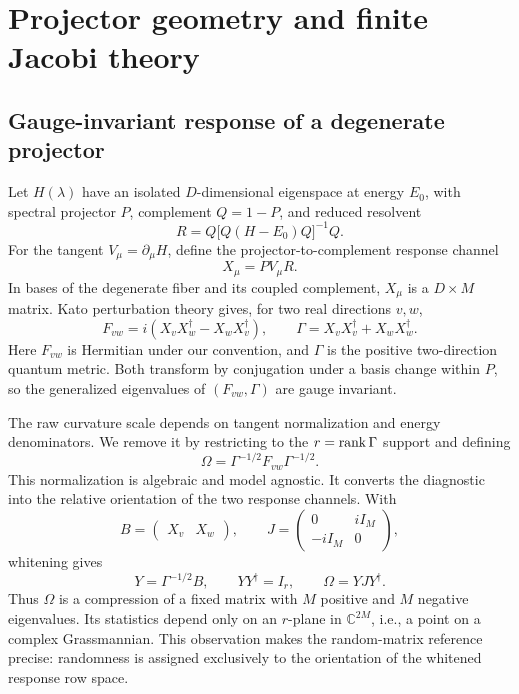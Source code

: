 \section{Projector geometry and finite Jacobi theory}
\label{sec:ensembles}

\subsection{Gauge-invariant response of a degenerate projector}

Let \(H(\lambda)\) have an isolated \(D\)-dimensional eigenspace at energy
\(E_0\), with spectral projector \(P\), complement \(Q=1-P\), and reduced
resolvent
\begin{equation}
 R=Q\bigl[Q(H-E_0)Q\bigr]^{-1}Q .
 \label{eq:reduced-resolvent}
\end{equation}
For the tangent \(V_\mu=\partial_\mu H\), define the
projector-to-complement response channel
\begin{equation}
 X_\mu=P V_\mu R .
 \label{eq:channel}
\end{equation}
In bases of the degenerate fiber and its coupled complement, \(X_\mu\) is a
\(D\times M\) matrix.
Kato perturbation theory gives, for two real directions \(v,w\),
\begin{equation}
 F_{vw}=i\left(X_vX_w^\dagger-X_wX_v^\dagger\right),\qquad
 \Gamma=X_vX_v^\dagger+X_wX_w^\dagger .
 \label{eq:curvature-metric}
\end{equation}
Here \(F_{vw}\) is Hermitian under our convention, and \(\Gamma\) is the
positive two-direction quantum metric.
Both transform by conjugation under a basis change within \(P\), so the
generalized eigenvalues of \((F_{vw},\Gamma)\) are gauge invariant.

The raw curvature scale depends on tangent normalization and energy
denominators.
We remove it by restricting to the \(r=\operatorname{rank}\Gamma\) support and defining
\begin{equation}
 \Omega=\Gamma^{-1/2}F_{vw}\Gamma^{-1/2}.
 \label{eq:normalized-curvature-intro}
\end{equation}
This normalization is algebraic and model agnostic.
It converts the diagnostic into the relative orientation of the two response
channels.
With
\begin{equation}
 B=\begin{pmatrix}X_v&X_w\end{pmatrix},\qquad
 J=\begin{pmatrix}0&iI_M\\-iI_M&0\end{pmatrix},
 \label{eq:BJ}
\end{equation}
whitening gives
\begin{equation}
 Y=\Gamma^{-1/2}B,\qquad
 YY^\dagger=I_r,\qquad
 \Omega=YJY^\dagger .
 \label{eq:isometry-compression}
\end{equation}
Thus \(\Omega\) is a compression of a fixed matrix with \(M\) positive and
\(M\) negative eigenvalues.
Its statistics depend only on an \(r\)-plane in
\(\mathbb C^{2M}\), i.e., a point on a complex Grassmannian.
This observation makes the random-matrix reference precise: randomness is
assigned exclusively to the orientation of the whitened response row space.

